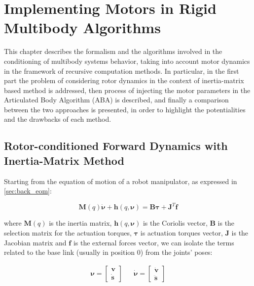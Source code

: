 \chapter{Implementing Motors in Rigid Multibody Algorithms}
\label{chp:contrib_ABA}

This chapter describes the formalism and the algorithms involved in the conditioning of multibody systems behavior, taking into account motor dynamics in the framework of recursive computation methods. In particular, in the first part the problem of considering rotor dynamics in the context of inertia-matrix based method is addressed, then process of injecting the motor parameters in the Articulated Body Algorithm (\ac{ABA}) is described, and finally a comparison between the two approaches is presented, in order to highlight the potentialities and the drawbacks of each method.

\section{Rotor-conditioned Forward Dynamics with Inertia-Matrix Method}

Starting from the equation of motion of a robot manipulator, as expressed in \cref{sec:back_eom}:

\begin{equation}
    \mathbf{M}(q)\dot{\boldsymbol{\nu}} + \mathbf{h}(q,\boldsymbol{\nu}) = \mathbf{B}\boldsymbol{\tau} + \mathbf{J} ^T \mathbf{f}
\end{equation}

where $\mathbf{M}(q)$ is the inertia matrix, $\mathbf{h}(q,\boldsymbol{\nu})$ is the Coriolis vector, $\mathbf{B}$ is the selection matrix for the actuation torques, $\boldsymbol{\tau}$ is actuation torques vector, $\mathbf{J}$ is the Jacobian matrix and $\mathbf{f}$ is the external forces vector, we can isolate the terms related to the base link (usually in position 0) from the joints' poses:

\begin{align}
    \boldsymbol{\nu} =
    \begin{bmatrix}
        \mathrm{\mathbf{v}} \\
        \dot{\mathbf{s}}
    \end{bmatrix} &  &
    \dot{\boldsymbol{\nu}} =
    \begin{bmatrix}
        \dot{\mathrm{\mathbf{v}}} \\
        \ddot{\mathbf{s}}
    \end{bmatrix}
\end{align}

